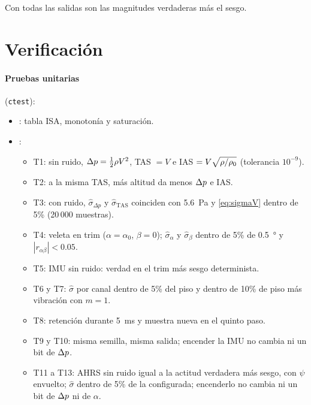 \documentclass[11pt,a4paper]{article}
\begin{document}
Con  todas las salidas son las magnitudes
verdaderas más el sesgo.

\section{Verificación}

\paragraph{Pruebas unitarias} (\texttt{ctest}):
\begin{itemize}
  \item {}: tabla ISA, monotonía y saturación.
  \item {}:
  \begin{itemize}
    \item T1: sin ruido, $\Delta p = \tfrac12\rho V^2$, TAS $=V$ e
          IAS $= V\sqrt{\rho/\rho_0}$ (tolerancia $10^{-9}$).
    \item T2: a la misma TAS, más altitud da menos $\Delta p$ e IAS.
    \item T3: con ruido, $\hat\sigma_{\Delta p}$ y $\hat\sigma_{\text{TAS}}$
          coinciden con \SI{5.6}{Pa} y \eqref{eq:sigmaV} dentro de 5\%
          (20\,000 muestras).
    \item T4: veleta en trim ($\alpha = \alpha_0$, $\beta = 0$);
          $\hat\sigma_\alpha$ y $\hat\sigma_\beta$ dentro de 5\% de
          \SI{0.5}{\degree} y $|r_{\alpha\beta}| < 0.05$.
    \item T5: IMU sin ruido: verdad en el trim más sesgo determinista.
    \item T6 y T7: $\hat\sigma$ por canal dentro de 5\% del piso y dentro de
          10\% de piso más vibración con $m=1$.
    \item T8: retención durante \SI{5}{ms} y muestra nueva en el quinto paso.
    \item T9 y T10: misma semilla, misma salida; encender la IMU no cambia
          ni un bit de $\Delta p$.
    \item T11 a T13: AHRS sin ruido igual a la actitud verdadera más sesgo, con
          $\psi$ envuelto; $\hat\sigma$ dentro de 5\% de la configurada;
          encenderlo no cambia ni un bit de $\Delta p$ ni de $\alpha$.
  \end{itemize}
\end{itemize}
\end{document}
